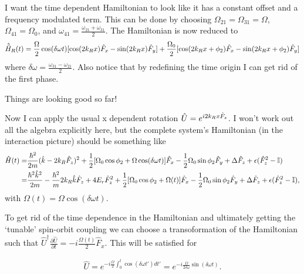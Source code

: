 I want the time dependent Hamiltonian to look like it has a constant offset and a frequency modulated term. This can be done by choosing $\Omega_{21} =\Omega_{31} = \Omega $, $\Omega_{41}=\Omega_0$, and $\omega_{41} =\frac{\omega_{21}+\omega_{31}}{2}$. The Hamiltonian is now reduced to 
%
%
\begin{align}
\begin{split}
\hat{\tilde{H}}_R(t) = \frac{\Omega}{2}\cos(\delta\omega t)[\cos(2{{k_R}} x)\hat{F}_x - \sin(2{{k_R}} x)\hat{F}_y] + \frac{\Omega_{0}}{2}[\cos(2{{k_R}} x + \phi_2)\hat{F}_x - \sin(2{{k_R}} x + \phi_2)\hat{F}_y] \\
\end{split}
\end{align}
%
%
where $\delta\omega=\frac{\omega_{31}-\omega_{21}}{2}$. Also notice that by redefining the time origin I can get rid of the first phase. 

Things are looking good so far!

Now I can apply the usual x dependent rotation $\hat{U} = e^{i2{{k_R}} x \hat{F}_z}$. I won't work out all the algebra explicitly here, but the complete system's Hamiltonian (in the interaction picture) should be something like
%
%
\begin{align}
\begin{split}
\hat{H}(t) = & \frac{\hbar^2}{2m}(\hat{k}-2{{k_R}}\hat{F}_z)^2 + \frac{1}{2}[\Omega_0\cos\phi_2 + \Omega\cos(\delta\omega t)]\hat{F}_x - \frac{1}{2}\Omega_0\sin\phi_2\hat{F}_y +\Delta\hat{F}_z + \epsilon(\hat{F}_z^2-\mathbb{I}) \\
= &\frac{\hbar^2\hat{k}^2}{2m} - \frac{\hbar^2}{m}2{{k_R}} \hat{k}\hat{F}_z +4E_r\hat{F}_z^2 + \frac{1}{2}[\Omega_0\cos\phi_2 + \Omega(t)]\hat{F}_x - \frac{1}{2}\Omega_0\sin\phi_2\hat{F}_y + \Delta\hat{F}_z +
\epsilon(\hat{F}_z^2-\mathbb{I}) ,
\end{split}
\end{align}
%
%
with $\Omega(t)=\Omega\cos(\delta\omega t)$.

To get rid of the time dependence in the Hamiltonian and ultimately getting the `tunable' spin-orbit coupling we can choose a transoformation of the Hamiltonian such that $\hat{U}^{\dagger} \frac{\partial\hat{U}}{\partial t} = -i \frac{\Omega(t)}{2}\hat{F}_x$. This will be satisfied for

\begin{align}
\hat{U} = e^{-i\frac{\Omega}{2}\int_0^t\cos(\delta\omega t')dt'} = e^{-i\frac{\Omega}{2\delta\omega}\sin(\delta\omega t)}.
\end{align}

